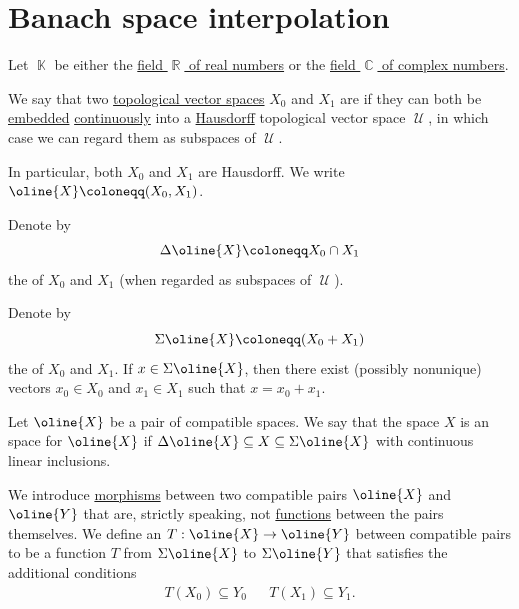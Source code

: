 \section{Banach space interpolation}\label{sec:banach_space_interpolation}

\begin{definition}\label{def:interpolated_topological_vector_space}
  Let \( \BbbK \) be either the \hyperref[def:real_numbers]{field \( \BbbR \) of real numbers} or the \hyperref[def:real_numbers]{field \( \BbbC \) of complex numbers}.

  \begin{thmenum}
     We say that two \hyperref[def:topological_vector_space]{topological vector spaces} \( X_0 \) and \( X_1 \) are  if they can both be \hyperref[def:morphism_cancellation/left]{embedded} \hyperref[def:global_continuity]{continuously} into a \hyperref[def:separation_axioms/T2]{Hausdorff} topological vector space \( \mscrU \), in which case we can regard them as subspaces of \( \mscrU \).

    In particular, both \( X_0 \) and \( X_1 \) are Hausdorff. We write \( \oline{X} \coloneqq (X_0, X_1) \).

     Denote by
    \begin{equation*}
      \Delta \oline{X} \coloneqq X_0 \cap X_1
    \end{equation*}
    the  of \( X_0 \) and \( X_1 \) (when regarded as subspaces of \( \mscrU \)).

     Denote by
    \begin{equation*}
      \Sigma \oline{X} \coloneqq ( X_0 + X_1 )
    \end{equation*}
    the  of \( X_0 \) and \( X_1 \). If \( x \in \Sigma \oline{X} \), then there exist (possibly nonunique) vectors \( x_0 \in X_0 \) and \( x_1 \in X_1 \) such that \( x = x_0 + x_1 \).

     Let \( \oline{X} \) be a pair of compatible spaces. We say that the space \( X \) is an  space for \( \oline{X} \) if \( \Delta \oline{X} \subseteq X \subseteq \Sigma \oline{X} \) with continuous linear inclusions.

     We introduce \hyperref[def:category/morphisms]{morphisms} between two compatible pairs \( \oline{X} \) and \( \oline{Y} \) that are, strictly speaking, not \hyperref[def:function]{functions} between the pairs themselves. We define an  \( T: \oline{X} \to \oline{Y} \) between compatible pairs to be a function \( T \) from \( \Sigma \oline{X} \) to \( \Sigma \oline{Y} \) that satisfies the additional conditions
    \begin{align*}
      T(X_0) \subseteq Y_0
      &&
      T(X_1) \subseteq Y_1.
    \end{align*}


\end{thmenum}
\end{definition}
